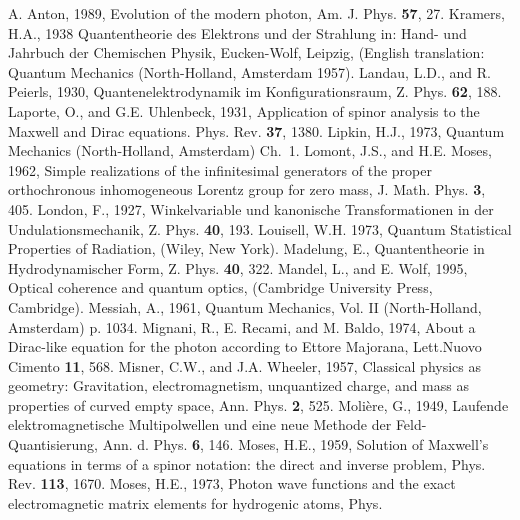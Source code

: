 \documentclass{article}
\begin{document}
\begin{thebibliography}{References}
A. Anton, 1989, Evolution of the modern photon, Am. J. Phys. {\bf 57}, 27.
 Kramers, H.A., 1938 Quantentheorie
des Elektrons und der Strahlung in: Hand- und Jahrbuch der Chemischen
Physik, Eucken-Wolf, Leipzig, (English translation: Quantum Mechanics
(North-Holland, Amsterdam 1957).
 Landau, L.D., and R. Peierls,
1930, Quantenelektrodynamik im Konfigurationsraum, Z. Phys. {\bf 62}, 188.
 Laporte, O., and G.E.
Uhlenbeck, 1931, Application of spinor analysis to the Maxwell and Dirac
equations. Phys. Rev. {\bf 37}, 1380.
 Lipkin, H.J., 1973, Quantum Mechanics
(North-Holland, Amsterdam) Ch.~1.
 Lomont, J.S., and H.E. Moses,
1962, Simple realizations of the infinitesimal generators of the proper
orthochronous inhomogeneous Lorentz group for zero mass, J. Math. Phys. {\bf
3}, 405.
 London, F., 1927, Winkelvariable und
kanonische Transformationen in der Undulationsmechanik, Z. Phys. {\bf 40},
193.
 Louisell, W.H. 1973, Quantum
Statistical Properties of Radiation, (Wiley, New York).
 Madelung, E., Quantentheorie in
Hydrodynamischer Form, Z. Phys. {\bf 40}, 322.
 Mandel, L., and E. Wolf, 1995,
Optical coherence and quantum optics, (Cambridge University Press,
Cambridge).
 Messiah, A., 1961, Quantum Mechanics,
Vol. II (North-Holland, Amsterdam) p. 1034.
 Mignani, R., E.
Recami, and M. Baldo, 1974, About a Dirac-like equation for the photon according to Ettore Majorana, Lett.Nuovo Cimento {\bf 11}, 568.
 Misner, C.W., and J.A. Wheeler,
1957, Classical physics as geometry: Gravitation, electromagnetism,
unquantized charge, and mass as properties of curved empty space, Ann. Phys.
{\bf 2}, 525.
 Moli\`ere, G., 1949, Laufende
elektromagnetische Multipolwellen und eine neue Methode der
Feld-Quantisierung, Ann. d. Phys. {\bf 6}, 146.
 Moses, H.E., 1959, Solution of Maxwell's
equations in terms of a spinor notation: the direct and inverse problem,
Phys. Rev. {\bf 113}, 1670.
 Moses, H.E., 1973, Photon wave functions
and the exact electromagnetic matrix elements for hydrogenic atoms, Phys.

\end{thebibliography}
\end{document}
